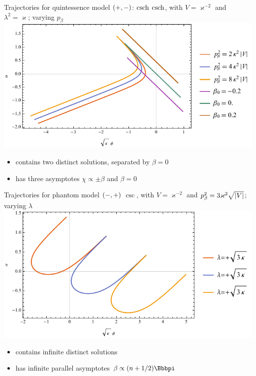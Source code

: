 \documentclass[9pt]{beamer}
\begin{document}
\begin{frame}%
{Trajectories for quintessence model ${\left(+,-\right)}$: $\operatorname{csch}$}%
{$\operatorname{csch}$, with $V = \varkappa^{-2}$ and
$\lambda^2 = \varkappa$; varying $p_\beta$}
\includegraphics[width=\textwidth]{./plots.nb/csch_pbet_l.pdf}
\begin{itemize}
	\item contains two distinct solutions, separated by $\beta = 0$
	\item has three asymptotes $\chi \propto \pm \beta$ and $\beta = 0$
\end{itemize}
\end{frame}

\begin{frame}%
{Trajectories for phantom model ${\left(-,+\right)}$}%
{$\csc$, with $V = \varkappa^{-2}$ and
$p_\beta^2 = 3\varkappa^2\sqrt{{\left|V\right|}}$; varying $\lambda$}
\includegraphics[width=\textwidth]{./plots.nb/csc_lamb_l.pdf}
\begin{itemize}
	\item contains infinite distinct solutions
	\item has infinite parallel asymptotes $\beta \propto \rbr{n+1/2}\pp $
\end{itemize}
\end{frame}
\end{document}
